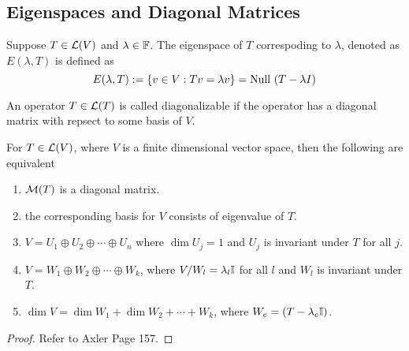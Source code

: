 \subsection{Eigenspaces and Diagonal Matrices}
\begin{definition}
    Suppose $T \in \mathcal L(V)$ and $\lambda \in \mathbb F$. The eigenspace of $T$ correspoding to $\lambda$, denoted as $E(\lambda, T)$ is defined as 
    \[ E(\lambda, T) := \left\{ v \in V : Tv = \lambda v \right\} = \text{Null } (T - \lambda I)\]
\end{definition}
\begin{definition}
    An operator $T \in \mathcal L(T)$ is called diagonalizable if the operator has a diagonal matrix with repsect to some basis of $V$.
\end{definition}
\begin{theorem}
    For $T \in \mathcal L(V)$, where $V$ is a finite dimensional vector space, then the following are equivalent
    \begin{enumerate}
        \item $\mathcal M(T)$ is a diagonal matrix.
        \item the corresponding basis for $V$ consists of eigenvalue of $T$.
        \item $V = U_1 \oplus U_2 \oplus \cdots \oplus U_n$ where $\dim U_j = 1$ and $U_j$ is invariant under $T$ for all $j$.
        \item $V = W_1 \oplus W_2 \oplus \cdots \oplus W_k$, where $V/W_l = \lambda_l \mathbb I$ for all $l$ and $W_l$ is invariant under $T$.
        \item $\dim V = \dim W_1 + \dim W_2 + \cdots + W_k$, where $W_e = \null (T - \lambda_e \b I)$.
    \end{enumerate}
\end{theorem}
\begin{proof}
Refer to Axler Page 157.
\end{proof}








